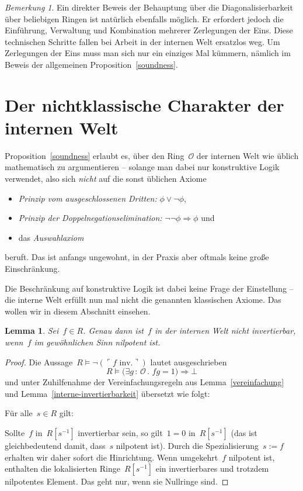 \documentclass[a4paper,ngerman,12pt]{scrartcl}
\theoremstyle{definition}
\theoremstyle{plain}
\newtheorem{lemma}[defn]{Lemma}
\theoremstyle{remark}
\newtheorem{bem}[defn]{Bemerkung}
\renewcommand{\O}{\mathcal{O}}
\renewcommand{\_}{\mathpunct{.}\,}
\newcommand{\?}{\,{:}\,}
\newcommand{\speak}[1]{\ulcorner\text{#1}\urcorner}
\newenvironment{indentblock}{%
  \list{}{\leftmargin\leftmargin}%
  \item\relax
}{%
  \endlist
}
\begin{document}
\begin{bem}Ein direkter Beweis der Behauptung über die Diagonalisierbarkeit
über beliebigen Ringen ist natürlich ebenfalls möglich. Er erfordert jedoch
die Einführung, Verwaltung und Kombination mehrerer Zerlegungen der Eins. Diese
technischen Schritte fallen bei Arbeit in der internen Welt ersatzlos weg. Um
Zerlegungen der Eins muss man sich nur ein einziges Mal kümmern, nämlich im
Beweis der allgemeinen Proposition~\ref{soundness}.\end{bem}


\section{Der nichtklassische Charakter der internen Welt}

Proposition~\ref{soundness} erlaubt es, über den Ring~$\O$ der internen Welt
wie üblich mathematisch zu argumentieren -- solange man dabei nur konstruktive
Logik verwendet, also sich \emph{nicht} auf die sonst üblichen Axiome
\begin{itemize}
\item \emph{Prinzip vom ausgeschlossenen Dritten:} $\phi \vee \neg\phi$,
\item \emph{Prinzip der Doppelnegationselimination:} $\neg\neg\phi \Rightarrow
\phi$ und
\item das \emph{Auswahlaxiom}
\end{itemize}
beruft. Das ist anfangs ungewohnt, in der Praxis aber oftmals keine große
Einschränkung.

Die Beschränkung auf konstruktive Logik ist dabei keine Frage der Einstellung
-- die interne Welt erfüllt nun mal nicht die genannten klassischen Axiome. Das
wollen wir in diesem Abschnitt einsehen.

\begin{lemma}Sei~$f \in R$. Genau dann ist~$f$ in der internen Welt nicht
invertierbar, wenn~$f$ im gewöhnlichen Sinn nilpotent ist.\end{lemma}
\begin{proof}Die Aussage~$R \models \neg(\speak{$f$ inv.})$ lautet ausgeschrieben
\[ R \models \bigl(\exists g\?\O\_ fg = 1\bigr) \Rightarrow \bot \]
und unter Zuhilfenahme der Vereinfachungsregeln aus Lemma~\ref{vereinfachung}
und Lemma~\ref{interne-invertierbarkeit} übersetzt wie folgt:
\begin{indentblock}
Für alle~$s \in R$ gilt:
\begin{indentblock}
Sollte~$f$ in~$R[s^{-1}]$ invertierbar sein, so gilt~$1 = 0$ in~$R[s^{-1}]$
(das ist gleichbedeutend damit, dass~$s$ nilpotent ist).
\end{indentblock}
\end{indentblock}
Durch die Spezialisierung~$s := f$ erhalten wir daher sofort die Hinrichtung.
Wenn umgekehrt~$f$ nilpotent ist, enthalten die lokalisierten Ringe~$R[s^{-1}]$
ein invertierbares und trotzdem nilpotentes Element. Das geht nur, wenn sie
Nullringe sind.
\end{proof}
\end{document}
